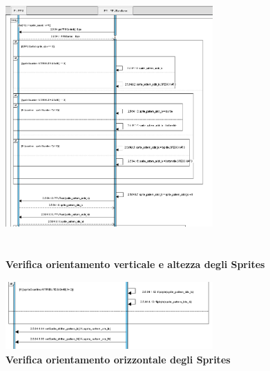 \documentclass[11pt]{article}
\begin{document}
\begin{figure}[h]
\hspace*{-4.2cm}
\centering
\includegraphics[width=300px, height=400px]{Sprite_Specchiati_Verticalmente.png}\\
\small\textbf{Verifica orientamento verticale e altezza degli Sprites}
\end{figure}
\begin{figure}[h]
\hspace*{-4.2cm}
\centering
\includegraphics[width=300px, height=100px]{Sprite_Specchiati_Orizzontalmente.png}\\
\small\textbf{Verifica orientamento orizzontale degli Sprites}
\end{figure}
\end{document}
